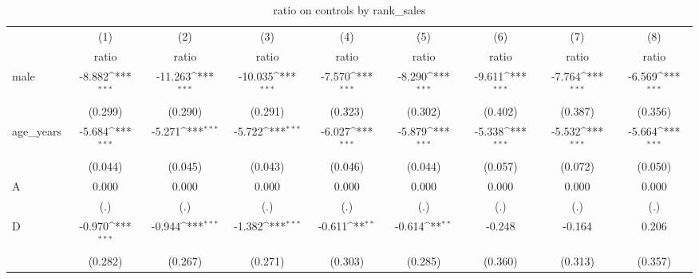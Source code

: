 \begin{table}[htbp]\centering
\def\sym#1{\ifmmode^{#1}\else\(^{#1}\)\fi}
\caption{ratio on controls by rank\_sales}
\begin{tabular}{l*{8}{c}}
\hline\hline
                    &\multicolumn{1}{c}{(1)}&\multicolumn{1}{c}{(2)}&\multicolumn{1}{c}{(3)}&\multicolumn{1}{c}{(4)}&\multicolumn{1}{c}{(5)}&\multicolumn{1}{c}{(6)}&\multicolumn{1}{c}{(7)}&\multicolumn{1}{c}{(8)}\\
                    &\multicolumn{1}{c}{ratio}&\multicolumn{1}{c}{ratio}&\multicolumn{1}{c}{ratio}&\multicolumn{1}{c}{ratio}&\multicolumn{1}{c}{ratio}&\multicolumn{1}{c}{ratio}&\multicolumn{1}{c}{ratio}&\multicolumn{1}{c}{ratio}\\
\hline
male                &      -8.882\sym{***}&     -11.263\sym{***}&     -10.035\sym{***}&      -7.570\sym{***}&      -8.290\sym{***}&      -9.611\sym{***}&      -7.764\sym{***}&      -6.569\sym{***}\\
                    &     (0.299)         &     (0.290)         &     (0.291)         &     (0.323)         &     (0.302)         &     (0.402)         &     (0.387)         &     (0.356)         \\
[1em]
age\_years           &      -5.684\sym{***}&      -5.271\sym{***}&      -5.722\sym{***}&      -6.027\sym{***}&      -5.879\sym{***}&      -5.338\sym{***}&      -5.532\sym{***}&      -5.664\sym{***}\\
                    &     (0.044)         &     (0.045)         &     (0.043)         &     (0.046)         &     (0.044)         &     (0.057)         &     (0.072)         &     (0.050)         \\
[1em]
A                   &       0.000         &       0.000         &       0.000         &       0.000         &       0.000         &       0.000         &       0.000         &       0.000         \\
                    &         (.)         &         (.)         &         (.)         &         (.)         &         (.)         &         (.)         &         (.)         &         (.)         \\
[1em]
D                   &      -0.970\sym{***}&      -0.944\sym{***}&      -1.382\sym{***}&      -0.611\sym{**} &      -0.614\sym{**} &      -0.248         &      -0.164         &       0.206         \\
                    &     (0.282)         &     (0.267)         &     (0.271)         &     (0.303)         &     (0.285)         &     (0.360)         &     (0.313)         &     (0.357)         \\

\end{tabular}
\end{table}
